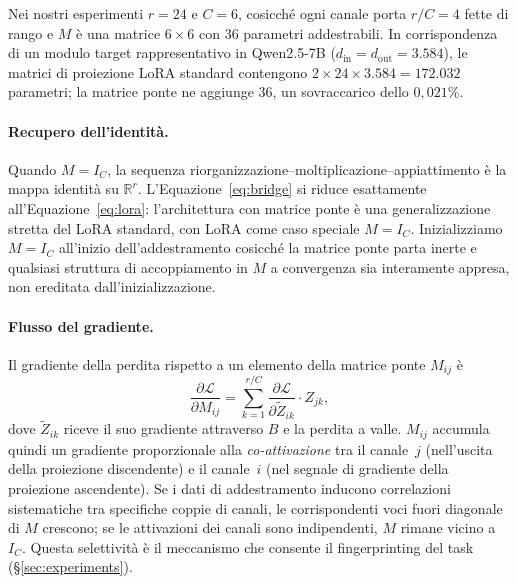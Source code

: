\documentclass[11pt]{article}
\begin{document}
Nei nostri esperimenti $r = 24$ e $C = 6$, cosicch\'e ogni canale porta
$r/C = 4$ fette di rango e $M$ \`e una matrice $6 \times 6$ con 36
parametri addestrabili.
In corrispondenza di un modulo target rappresentativo in Qwen2.5-7B
($d_\text{in} = d_\text{out} = 3.584$), le matrici di proiezione LoRA
standard contengono $2 \times 24 \times 3.584 = 172.032$ parametri; la
matrice ponte ne aggiunge 36, un sovraccarico dello $0{,}021\%$.

\paragraph{Recupero dell'identit\`a.}
Quando $M = I_C$, la sequenza riorganizzazione--moltiplicazione--appiattimento
\`e la mappa identit\`a su $\mathbb{R}^r$.
L'Equazione~\eqref{eq:bridge} si riduce esattamente
all'Equazione~\eqref{eq:lora}: l'architettura con matrice ponte \`e una
generalizzazione stretta del LoRA standard, con LoRA come caso speciale
$M = I_C$.
Inizializziamo $M = I_C$ all'inizio dell'addestramento cosicch\'e la
matrice ponte parta inerte e qualsiasi struttura di accoppiamento in $M$
a convergenza sia interamente appresa, non ereditata dall'inizializzazione.

\paragraph{Flusso del gradiente.}
Il gradiente della perdita rispetto a un elemento della matrice ponte
$M_{ij}$ \`e
\begin{equation}
  \frac{\partial \mathcal{L}}{\partial M_{ij}}
  = \sum_{k=1}^{r/C}
    \frac{\partial \mathcal{L}}{\partial \tilde{Z}_{ik}}
    \cdot Z_{jk},
  \label{eq:bridge-grad}
\end{equation}
dove $\tilde{Z}_{ik}$ riceve il suo gradiente attraverso $B$ e la
perdita a valle.
$M_{ij}$ accumula quindi un gradiente proporzionale alla
\emph{co-attivazione} tra il canale~$j$ (nell'uscita della proiezione
discendente) e il canale~$i$ (nel segnale di gradiente della proiezione
ascendente).
Se i dati di addestramento inducono correlazioni sistematiche tra
specifiche coppie di canali, le corrispondenti voci fuori diagonale di
$M$ crescono; se le attivazioni dei canali sono indipendenti, $M$
rimane vicino a $I_C$.
Questa selettivit\`a \`e il meccanismo che consente il fingerprinting
del task (\S\ref{sec:experiments}).
\end{document}
